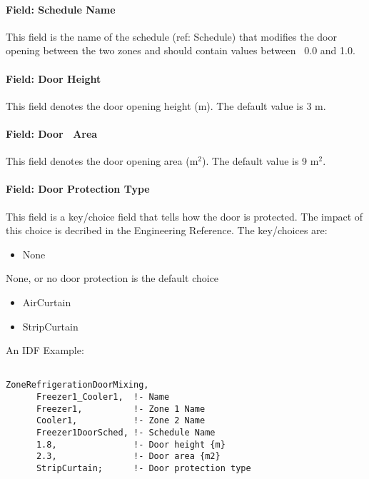 \paragraph{Field: Schedule Name}\label{field-schedule-name-5}

This field is the name of the schedule (ref: Schedule) that modifies the door opening between the two zones and should contain values between~ 0.0 and 1.0.

\paragraph{Field: Door Height}\label{field-door-height}

This field denotes the door opening height (m). The default value is 3 m.

\paragraph{Field: Door~ Area}\label{field-door-area}

This field denotes the door opening area (m\(^{2}\)). The default value is 9 m\(^{2}\).

\paragraph{Field: Door Protection Type}\label{field-door-protection-type}

This field is a key/choice field that tells how the door is protected. The impact of this choice is decribed in the Engineering Reference. The key/choices are:

\begin{itemize}
\tightlist
\item
  None
\end{itemize}

None, or no door protection is the default choice

\begin{itemize}
\item
  AirCurtain
\item
  StripCurtain
\end{itemize}

An IDF Example:

\begin{lstlisting}

ZoneRefrigerationDoorMixing,
      Freezer1_Cooler1,  !- Name
      Freezer1,          !- Zone 1 Name
      Cooler1,           !- Zone 2 Name
      Freezer1DoorSched, !- Schedule Name
      1.8,               !- Door height {m}
      2.3,               !- Door area {m2}
      StripCurtain;      !- Door protection type
\end{lstlisting}

